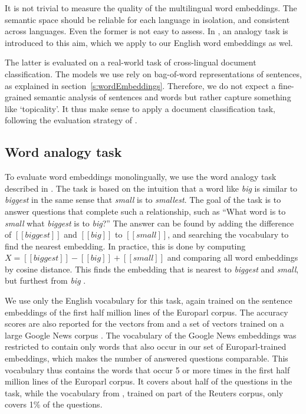 

It is not trivial to measure the quality of the multilingual word embeddings. The semantic space should be reliable for each language in isolation, and consistent across languages. 
Even the former is not easy to assess. In \cite{mikolov2013efficient}, an analogy task is introduced to this aim, which we apply to our English word embeddings as wel.

The latter is evaluated on a real-world task of cross-lingual document classification. The models we use rely on bag-of-word representations of sentences, as explained in section~\ref{s:wordEmbeddings}. Therefore, we do not expect a fine-grained semantic analysis of sentences and words but rather capture something like `topicality'. It thus make sense to apply a document classification task, following the evaluation strategy of  \cite{klementiev2012inducing, hermann2013multilingual,hermann2014multilingual}.


\subsection{Word analogy task}
To evaluate word embeddings monolingually, we use the word analogy task described in \cite{mikolov2013efficient}.
The task is based on the intuition that a word like \emph{big} is similar to \emph{biggest} in the same sense that \emph{small} is to \emph{smallest}.
The goal of the task is to answer questions that complete such a relationship, such as ``What word is to \emph{small} what \emph{biggest} is to \emph{big}?''
The answer can be found by adding the difference of $[\![\mathit{biggest}]\!]$ and $[\![\mathit{big}]\!]$ to $[\![\mathit{small}]\!]$, and searching the vocabulary to find the nearest embedding.
In practice, this is done by computing $X = [\![\mathit{biggest}]\!] - [\![\mathit{big}]\!]+ [\![\mathit{small}]\!]$ and comparing all word embeddings by cosine distance.
This finds the embedding that is nearest to \emph{biggest} and \emph{small}, but furthest from \emph{big} \cite{Levy2014}.

We use only the English vocabulary for this task, again trained on the sentence embeddings of the first half million lines of the Europarl corpus.
The accuracy scores are also reported for the vectors from \cite{klementiev2012inducing} and a set of vectors trained on a large Google News corpus \cite{mikolov2013efficient}.
The vocabulary of the Google News embeddings was restricted to contain only words that also occur in our set of Europarl-trained embeddings, which makes the number of answered questions comparable.
This vocabulary thus contains the words that occur 5 or more times in the first half million lines of the Europarl corpus.
It covers about half of the questions in the task, while the vocabulary from \cite{klementiev2012inducing}, trained on part of the Reuters corpus, only covers 1\% of the questions. 


